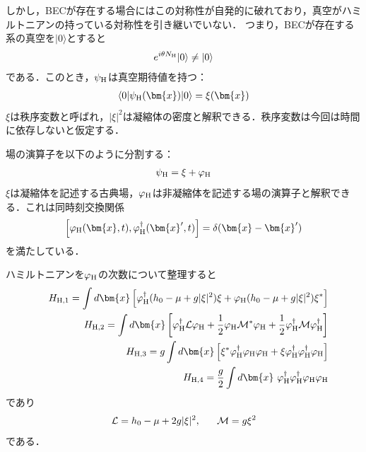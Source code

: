 \documentclass[10.5pt,a4paper]{jreport}
\begin{document}
しかし，BECが存在する場合にはこの対称性が自発的に破れており，真空がハミルトニアンの持っている対称性を引き継いでいない．
つまり，BECが存在する系の真空を$|0\rangle$とすると
\begin{eqnarray}
  e^{i\theta N_{\rm H}}|0\rangle \neq |0\rangle
\end{eqnarray}
である．このとき，$\psi_{\rm H}$は真空期待値を持つ：
\begin{eqnarray}
  \langle 0|\psi_{\rm H}(\bm{x})|0\rangle = \xi(\bm{x})\label{vaccum_ex1}
\end{eqnarray}
$\xi$は秩序変数と呼ばれ，$|\xi|^2$は凝縮体の密度と解釈できる．秩序変数は今回は時間に依存しないと仮定する．

場の演算子を以下のように分割する：
\begin{eqnarray}
  \psi_{\rm H} = \xi + \varphi_{\rm H}
\end{eqnarray}
$\xi$は凝縮体を記述する古典場，$\varphi_{\rm H}$は非凝縮体を記述する場の演算子と解釈できる．これは同時刻交換関係
\begin{eqnarray}
  \left[\varphi_{\rm H}(\bm{x},t),\varphi^\dagger_{\rm H}(\bm{x}',t)\right]  = \delta(\bm{x}-\bm{x}')\label{equal_time_commutation}
\end{eqnarray}
を満たしている．

ハミルトニアンを$\varphi_{\rm H}$の次数について整理すると
\begin{eqnarray}
  &&H_{{\rm H},1} = \int d\bm{x}\left[\varphi^\dagger_{\rm H}(h_0 - \mu + g|\xi|^2)\xi + \varphi_{\rm H}(h_0 - \mu + g|\xi|^2)\xi^*\right]\\
  &&H_{{\rm H},2} = \int d\bm{x}\left[\varphi^\dagger_{\rm H} {\cal L}\varphi_{\rm H} + \frac{1}{2}\varphi_{\rm H}{\cal M^*}\varphi_{\rm H}+\frac{1}{2}\varphi^\dagger_{\rm H}{\cal M}\varphi^\dagger_{\rm H}\right]\\
  &&H_{{\rm H},3} = g\int d\bm{x}\left[\xi^*\varphi^\dagger_{\rm H}\varphi_{\rm H}\varphi_{\rm H} + \xi\varphi^\dagger_{\rm H}\varphi^\dagger_{\rm H}\varphi_{\rm H} \right] \\
  &&H_{{\rm H},4} = \frac{g}{2}\int d\bm{x}\ \varphi^\dagger_{\rm H}\varphi^\dagger_{\rm H}\varphi_{\rm H}\varphi_{\rm H}
\end{eqnarray}
であり
\begin{eqnarray}
  {\cal L} = h_0 - \mu +2g|\xi|^2,\ \ \ \ \ {\cal M}=g\xi^2
\end{eqnarray}
である．
\end{document}
